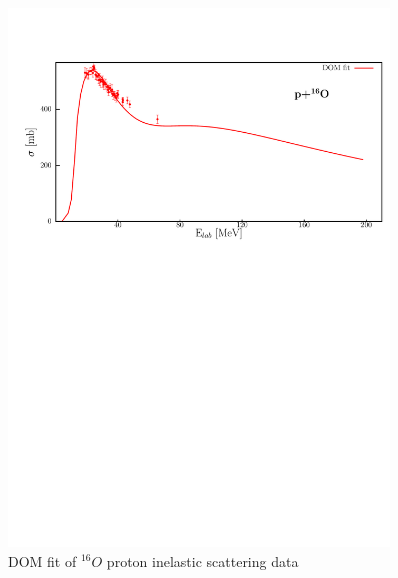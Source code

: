 \begin{figure}
\begin{center}
\includegraphics[width = 0.9\textwidth]{figures/o16_protonInelastic.png}
\caption{DOM fit of $^{16}O$ proton inelastic scattering data}
\label{o16ProtonInelastic}
\end{center}
\end{figure}

